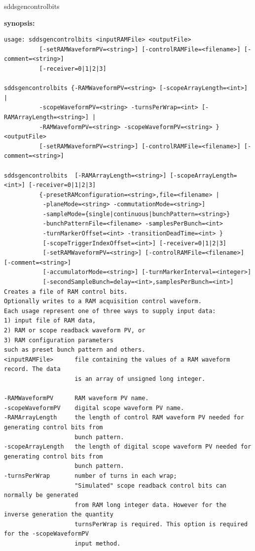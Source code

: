 \begin{sddsprog}{sddsgencontrolbits}
\item \textbf{synopsis:}
\small
\begin{verbatim}
usage: sddsgencontrolbits <inputRAMFile> <outputFile>
          [-setRAMWaveformPV=<string>] [-controlRAMFile=<filename>] [-comment=<string>] 
          [-receiver=0|1|2|3]

sddsgencontrolbits {-RAMWaveformPV=<string> [-scopeArrayLength=<int>] |
          -scopeWaveformPV=<string> -turnsPerWrap=<int> [-RAMArrayLength=<string>] |
          -RAMWaveformPV=<string> -scopeWaveformPV=<string> } <outputFile>
          [-setRAMWaveformPV=<string>] [-controlRAMFile=<filename>] [-comment=<string>]

sddsgencontrolbits  [-RAMArrayLength=<string>] [-scopeArrayLength=<int>] [-receiver=0|1|2|3]
          {-presetRAMconfiguration=<string>,file=<filename> |
           -planeMode=<string> -commutationMode=<string>]
           -sampleMode={single|continuous|bunchPattern=<string>}
           -bunchPatternFile=<filename> -samplesPerBunch=<int>
           -turnMarkerOffset=<int> -transitionDeadTime=<int> }
           [-scopeTriggerIndexOffset=<int>] [-receiver=0|1|2|3]
           [-setRAMWaveformPV=<string>] [-controlRAMFile=<filename>] [-comment=<string>]
           [-accumulatorMode=<string>] [-turnMarkerInterval=<integer>]
           [-secondSampleBunch=delay=<int>,samplesPerBunch=<int>]
Creates a file of RAM control bits.
Optionally writes to a RAM acquisition control waveform.
Each usage represent one of three ways to supply input data:
1) input file of RAM data,
2) RAM or scope readback waveform PV, or
3) RAM configuration parameters
such as preset bunch pattern and others.
<inputRAMFile>      file containing the values of a RAM waveform record. The data
                    is an array of unsigned long integer.

-RAMWaveformPV      RAM waveform PV name.
-scopeWaveformPV    digital scope waveform PV name.
-RAMArrayLength     the length of control RAM waveform PV needed for generating control bits from
                    bunch pattern.
-scopeArrayLength   the length of digital scope waveform PV needed for generating control bits from
                    bunch pattern.
-turnsPerWrap       number of turns in each wrap;
                    "Simulated" scope readback control bits can normally be generated
                    from RAM long integer data. However for the inverse generation the quantity 
                    turnsPerWrap is required. This option is required for the -scopeWaveformPV 
                    input method.


\end{verbatim}
\end{sddsprog}
